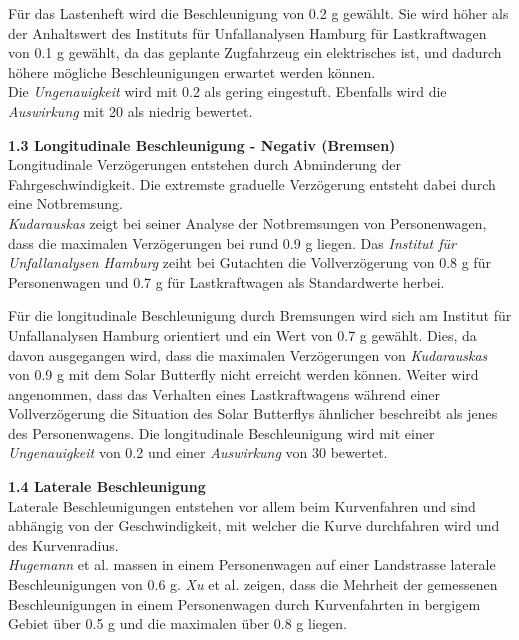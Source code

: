\begin{description}
    Für das Lastenheft wird die Beschleunigung von 0.2 g gewählt. Sie wird höher als der Anhaltswert des Instituts für Unfallanalysen Hamburg für Lastkraftwagen von 0.1 g gewählt, da das geplante Zugfahrzeug ein elektrisches ist, und dadurch höhere mögliche Beschleunigungen erwartet werden können.\\
    Die \emph{Ungenauigkeit} wird mit 0.2 als gering eingestuft. Ebenfalls wird die \emph{Auswirkung} mit 20 als niedrig bewertet.

    \item \textbf{1.3 Longitudinale Beschleunigung - Negativ (Bremsen)}\\
    Longitudinale Verzögerungen entstehen durch Abminderung der Fahrgeschwindigkeit. Die extremste graduelle Verzögerung entsteht dabei durch eine Notbremsung.\\
    \emph{Kudarauskas} \cite{Verz.1} zeigt bei seiner Analyse der Notbremsungen von Personenwagen, dass die maximalen Verzögerungen bei rund 0.9 g liegen. Das \emph{Institut für Unfallanalysen Hamburg} \cite{Verz.2} zeiht bei Gutachten die Vollverzögerung von 0.8 g für Personenwagen und 0.7 g für Lastkraftwagen als Standardwerte herbei.

    Für die longitudinale Beschleunigung durch Bremsungen wird sich am Institut für Unfallanalysen Hamburg orientiert und ein Wert von 0.7 g gewählt. Dies, da davon ausgegangen wird, dass die maximalen Verzögerungen von \emph{Kudarauskas} von 0.9 g mit dem Solar Butterfly nicht erreicht werden können. Weiter wird angenommen, dass das Verhalten eines Lastkraftwagens während einer Vollverzögerung die Situation des Solar Butterflys ähnlicher beschreibt als jenes des Personenwagens.
    Die longitudinale Beschleunigung wird mit einer \emph{Ungenauigkeit} von 0.2 und einer \emph{Auswirkung} von 30 bewertet.

    \item \textbf{1.4 Laterale Beschleunigung}\\
    Laterale Beschleunigungen entstehen vor allem beim Kurvenfahren und sind abhängig von der Geschwindigkeit, mit welcher die Kurve durchfahren wird und des Kurvenradius.\\
    \emph{Hugemann} et al. \cite{Kurv.1} massen in einem Personenwagen auf einer Landstrasse laterale Beschleunigungen von 0.6 g. \emph{Xu} et al. \cite{Kurv.2} zeigen, dass die Mehrheit der gemessenen Beschleunigungen in einem Personenwagen durch Kurvenfahrten in bergigem Gebiet über 0.5 g und die maximalen über 0.8 g liegen.


\end{description}
